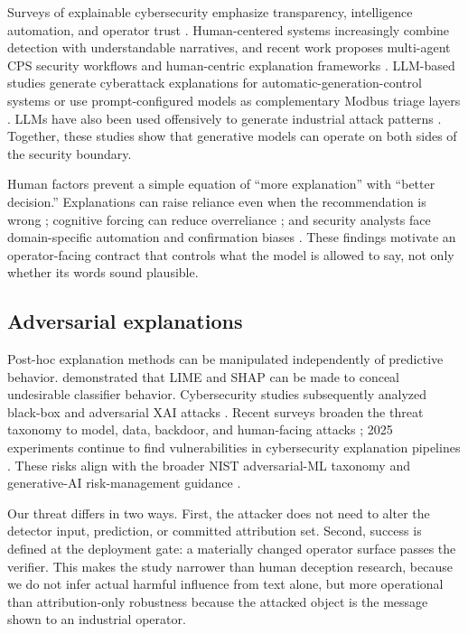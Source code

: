 Surveys of explainable cybersecurity emphasize transparency, intelligence automation, and operator trust \citep{zhang2022xaicyber,sarker2024xai,sharma2025review}. Human-centered systems increasingly combine detection with understandable narratives, and recent work proposes multi-agent CPS security workflows \citep{ferraro2026multiagent} and human-centric explanation frameworks \citep{barik2026deepguard}. LLM-based studies generate cyberattack explanations for automatic-generation-control systems \citep{sharshar2025llm} or use prompt-configured models as complementary Modbus triage layers \citep{kong2026llm}. LLMs have also been used offensively to generate industrial attack patterns \citep{ahmed2025attackllm}. Together, these studies show that generative models can operate on both sides of the security boundary.

Human factors prevent a simple equation of ``more explanation'' with ``better decision.'' Explanations can raise reliance even when the recommendation is wrong \citep{bansal2021whole}; cognitive forcing can reduce overreliance \citep{bucinca2021trust}; and security analysts face domain-specific automation and confirmation biases \citep{hagen2025human}. These findings motivate an operator-facing contract that controls what the model is allowed to say, not only whether its words sound plausible.

\subsection{Adversarial explanations}

Post-hoc explanation methods can be manipulated independently of predictive behavior. \citet{slack2020fooling} demonstrated that LIME and SHAP can be made to conceal undesirable classifier behavior. Cybersecurity studies subsequently analyzed black-box and adversarial XAI attacks \citep{kuppa2020blackbox,kuppa2021adversarial}. Recent surveys broaden the threat taxonomy to model, data, backdoor, and human-facing attacks \citep{baniecki2024survey,vadillo2025survey}; 2025 experiments continue to find vulnerabilities in cybersecurity explanation pipelines \citep{mia2025vulnerable}. These risks align with the broader NIST adversarial-ML taxonomy \citep{vassilev2025aml} and generative-AI risk-management guidance \citep{nist2024genai}.

Our threat differs in two ways. First, the attacker does not need to alter the detector input, prediction, or committed attribution set. Second, success is defined at the deployment gate: a materially changed operator surface passes the verifier. This makes the study narrower than human deception research, because we do not infer actual harmful influence from text alone, but more operational than attribution-only robustness because the attacked object is the message shown to an industrial operator.

